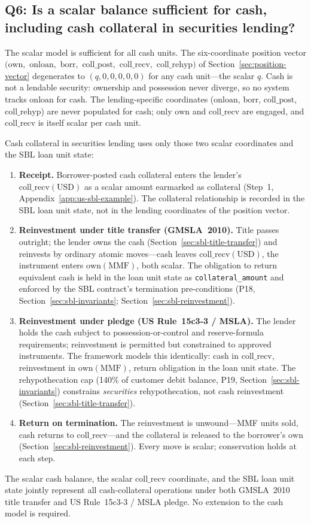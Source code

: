 \subsection*{Q6: Is a scalar balance sufficient for cash, including cash collateral in securities lending?}

The scalar model is sufficient for all cash units. The six-coordinate position vector $(\mathrm{own},$ $\mathrm{onloan},$ $\mathrm{borr},$ $\mathrm{coll\_post},$ $\mathrm{coll\_recv},$ $\mathrm{coll\_rehyp})$ of Section~\ref{sec:position-vector} degenerates to $(q,0,0,0,0,0)$ for any cash unit---the scalar $q$. Cash is not a lendable security: ownership and possession never diverge, so no system tracks $\mathrm{onloan}$ for cash. The lending-specific coordinates ($\mathrm{onloan}$, $\mathrm{borr}$, $\mathrm{coll\_post}$, $\mathrm{coll\_rehyp}$) are never populated for cash; only $\mathrm{own}$ and $\mathrm{coll\_recv}$ are engaged, and $\mathrm{coll\_recv}$ is itself scalar per cash unit.

Cash collateral in securities lending uses only those two scalar coordinates and the SBL loan unit state:

\begin{enumerate}[nosep]
\item \textbf{Receipt.} Borrower-posted cash collateral enters the lender's $\mathrm{coll\_recv}(\text{USD})$ as a scalar amount earmarked as collateral (Step~1, Appendix~\ref{app:us-sbl-example}). The collateral relationship is recorded in the SBL loan unit state, not in the lending coordinates of the position vector.

\item \textbf{Reinvestment under title transfer (GMSLA~2010).} Title passes outright; the lender owns the cash (Section~\ref{sec:sbl-title-transfer}) and reinvests by ordinary atomic moves---cash leaves $\mathrm{coll\_recv}(\text{USD})$, the instrument enters $\mathrm{own}(\text{MMF})$, both scalar. The obligation to return equivalent cash is held in the loan unit state as \texttt{collateral\_amount} and enforced by the SBL contract's termination pre-conditions (P18, Section~\ref{sec:sbl-invariants}; Section~\ref{sec:sbl-reinvestment}).

\item \textbf{Reinvestment under pledge (US Rule~15c3-3 / MSLA).} The lender holds the cash subject to possession-or-control and reserve-formula requirements; reinvestment is permitted but constrained to approved instruments. The framework models this identically: cash in $\mathrm{coll\_recv}$, reinvestment in $\mathrm{own}(\text{MMF})$, return obligation in the loan unit state. The rehypothecation cap (140\% of customer debit balance, P19, Section~\ref{sec:sbl-invariants}) constrains \emph{securities} rehypothecation, not cash reinvestment (Section~\ref{sec:sbl-title-transfer}).

\item \textbf{Return on termination.} The reinvestment is unwound---MMF units sold, cash returns to $\mathrm{coll\_recv}$---and the collateral is released to the borrower's $\mathrm{own}$ (Section~\ref{sec:sbl-reinvestment}). Every move is scalar; conservation holds at each step.
\end{enumerate}

\noindent The scalar cash balance, the scalar $\mathrm{coll\_recv}$ coordinate, and the SBL loan unit state jointly represent all cash-collateral operations under both GMSLA~2010 title transfer and US Rule~15c3-3 / MSLA pledge. No extension to the cash model is required.
